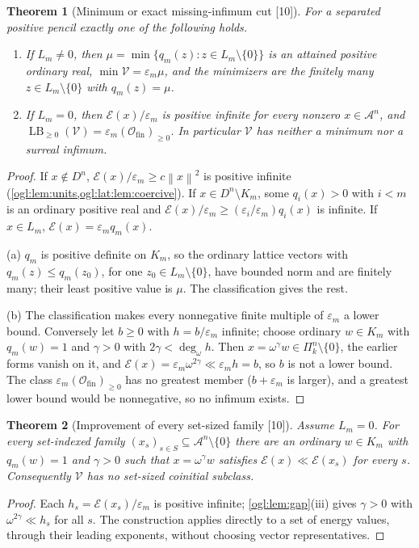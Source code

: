 \documentclass[11pt,oneside]{article}
\numberwithin{equation}{section}
\newtheorem{theorem}{Theorem}[section]
\theoremstyle{definition}
\theoremstyle{remark}
\newcommand{\A}{\mathcal A}
\newcommand{\cE}{\mathcal E}
\newcommand{\Ofin}{\mathcal O_{\mathrm{fin}}}
\newcommand{\ddeg}{\operatorname{deg}_{\omega}}
\newcommand{\LB}{\operatorname{LB}_{\ge0}}
\newcommand{\norm}[1]{\left\lVert #1\right\rVert}
\newcommand{\src}[1]{\textup{\textsf{\small[#1]}}}
\begin{document}
\begin{theorem}[Minimum or exact missing-infimum cut \src{10}]\label{ogl:lat:thm:main}
For a separated positive pencil exactly one of the following holds.
\begin{enumerate}[label=\textup{(\alph*)}]
\item If $L_m\ne0$, then $\mu=\min\{q_m(z):z\in L_m\setminus\{0\}\}$ is an
attained positive ordinary real, $\min\mathscr V=\varepsilon_m\mu$, and the
minimizers are the finitely many $z\in L_m\setminus\{0\}$ with $q_m(z)=\mu$.
\item If $L_m=0$, then $\cE(x)/\varepsilon_m$ is positive infinite for every
nonzero $x\in\A^n$, and $\LB(\mathscr V)=\varepsilon_m(\Ofin)_{\ge0}$. In
particular $\mathscr V$ has neither a minimum nor a surreal infimum.
\end{enumerate}
\end{theorem}
\begin{proof}
If $x\notin D^n$, $\cE(x)/\varepsilon_m\ge c\norm{x}^2$ is positive infinite
(\cref{ogl:lem:units,ogl:lat:lem:coercive}). If $x\in D^n\setminus K_m$, some
$q_i(x)>0$ with $i<m$ is an ordinary positive real and
$\cE(x)/\varepsilon_m\ge(\varepsilon_i/\varepsilon_m)q_i(x)$ is infinite. If
$x\in L_m$, $\cE(x)=\varepsilon_mq_m(x)$.

(a) $q_m$ is positive definite on $K_m$, so the ordinary lattice vectors with
$q_m(z)\le q_m(z_0)$, for one $z_0\in L_m\setminus\{0\}$, have bounded norm and
are finitely many; their least positive value is $\mu$. The classification gives
the rest.

(b) The classification makes every nonnegative finite multiple of
$\varepsilon_m$ a lower bound. Conversely let $b\ge0$ with $h=b/\varepsilon_m$
infinite; choose ordinary $w\in K_m$ with $q_m(w)=1$ and $\gamma>0$ with
$2\gamma<\ddeg h$. Then $x=\omega^\gamma w\in\Pi_k^n\setminus\{0\}$, the earlier
forms vanish on it, and $\cE(x)=\varepsilon_m\omega^{2\gamma}\ll\varepsilon_mh=b$,
so $b$ is not a lower bound. The class $\varepsilon_m(\Ofin)_{\ge0}$ has no
greatest member ($b+\varepsilon_m$ is larger), and a greatest lower bound would
be nonnegative, so no infimum exists.
\end{proof}

\begin{theorem}[Improvement of every set-sized family \src{10}]\label{ogl:lat:thm:simultaneous}
Assume $L_m=0$. For every set-indexed family
$(x_s)_{s\in S}\subseteq\A^n\setminus\{0\}$ there are an ordinary $w\in K_m$ with
$q_m(w)=1$ and $\gamma>0$ such that $x=\omega^\gamma w$ satisfies
$\cE(x)\ll\cE(x_s)$ for every $s$. Consequently $\mathscr V$ has no set-sized
coinitial subclass.
\end{theorem}
\begin{proof}
Each $h_s=\cE(x_s)/\varepsilon_m$ is positive infinite; \cref{ogl:lem:gap}(iii)
gives $\gamma>0$ with $\omega^{2\gamma}\ll h_s$ for all $s$. The construction
applies directly to a set of energy values, through their leading exponents,
without choosing vector representatives.
\end{proof}
\end{document}
